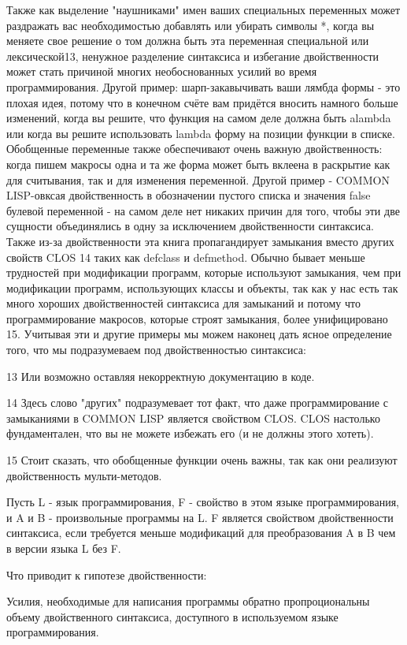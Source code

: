 Также как выделение "наушниками" имен ваших специальных переменных может раздражать вас необходимостью добавлять или убирать символы *, когда вы меняете свое решение о том должна быть эта переменная специальной или лексической13, ненужное разделение синтаксиса и избегание двойственности может стать причиной многих необоснованных усилий во время программирования. Другой пример: шарп-закавычивать ваши лямбда формы - это плохая идея, потому что в конечном счёте вам придётся вносить намного больше изменений, когда вы решите, что функция на самом деле должна быть alambda или когда вы решите использовать lambda форму на позиции функции в списке. Обобщенные переменные также обеспечивают очень важную двойственность: когда пишем макросы одна и та же форма может быть вклеена в раскрытие как для считывания, так и для изменения переменной. Другой пример - COMMON LISP-овксая двойственность в обозначении пустого списка и значения false булевой переменной - на самом деле нет никаких причин для того, чтобы эти две сущности объединялись в одну за исключением двойственности синтаксиса. Также из-за двойственности эта книга пропагандирует замыкания вместо других свойств CLOS 14 таких как defclass и defmethod. Обычно бывает меньше трудностей при модификации программ, которые используют замыкания, чем при модификации программ, использующих классы и объекты, так как у нас есть так много хороших двойственностей синтаксиса для замыканий и потому что программирование макросов, которые строят замыкания, более унифицировано 15. Учитывая эти и другие примеры мы можем наконец дать ясное определение того, что мы подразумеваем под двойственностью синтаксиса:

13 Или возможно оставляя некорректную документацию в коде.

14 Здесь слово "других" подразумевает тот факт, что даже программирование с замыканиями в COMMON LISP является свойством CLOS. CLOS настолько фундаментален, что вы не можете избежать его (и не должны этого хотеть).

15 Стоит сказать, что обобщенные функции очень важны, так как они реализуют двойственность мульти-методов.

Пусть L - язык программирования, F - свойство в этом языке программирования, и A и B - произвольные программы на L. F является свойством двойственности синтаксиса, если требуется меньше модификаций для преобразования A в B чем в версии языка L без F.

Что приводит к гипотезе двойственности:

Усилия, необходимые для написания программы обратно пропроциональны объему двойственного синтаксиса, доступного в используемом языке программирования.

